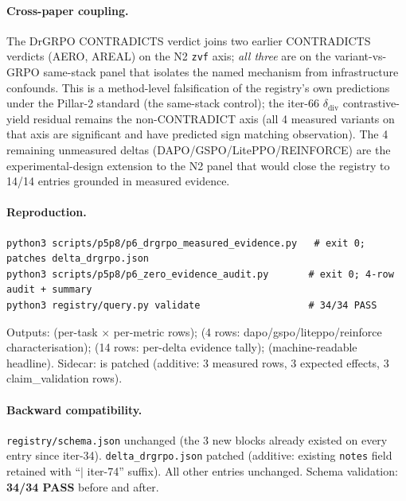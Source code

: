 \documentclass{article}
\begin{document}
\paragraph{Cross-paper coupling.}
The DrGRPO CONTRADICTS verdict joins two earlier CONTRADICTS verdicts
(AERO, AREAL) on the N2 \texttt{zvf} axis; \emph{all three} are
on the variant-vs-GRPO same-stack panel that isolates the named
mechanism from infrastructure confounds. This is a method-level
falsification of the registry's own predictions under the
Pillar-2 standard (the same-stack control); the iter-66
$\delta_{\text{div}}$ contrastive-yield residual remains the
non-CONTRADICT axis (all 4 measured variants on that axis are
significant and have predicted sign matching observation).
The 4 remaining unmeasured deltas (DAPO/GSPO/LitePPO/REINFORCE)
are the experimental-design extension to the N2 panel that would
close the registry to 14/14 entries grounded in measured evidence.

\paragraph{Reproduction.}
\begin{lstlisting}[basicstyle=\ttfamily\scriptsize,breaklines=true]
python3 scripts/p5p8/p6_drgrpo_measured_evidence.py   # exit 0; patches delta_drgrpo.json
python3 scripts/p5p8/p6_zero_evidence_audit.py       # exit 0; 4-row audit + summary
python3 registry/query.py validate                   # 34/34 PASS
\end{lstlisting}
Outputs: 
(per-task $\times$ per-metric rows); 
(4 rows: dapo/gspo/liteppo/reinforce characterisation);
 (14 rows: per-delta
evidence tally); 
(machine-readable headline). Sidecar: 
is patched (additive: 3 measured rows, 3 expected effects,
3 claim\_validation rows).

\paragraph{Backward compatibility.}
\texttt{registry/schema.json} unchanged (the 3 new blocks already
existed on every entry since iter-34). \texttt{delta\_drgrpo.json}
patched (additive: existing \texttt{notes} field retained with
``$|$ iter-74'' suffix). All other entries unchanged. Schema
validation: \textbf{34/34 PASS} before and after.
\end{document}
